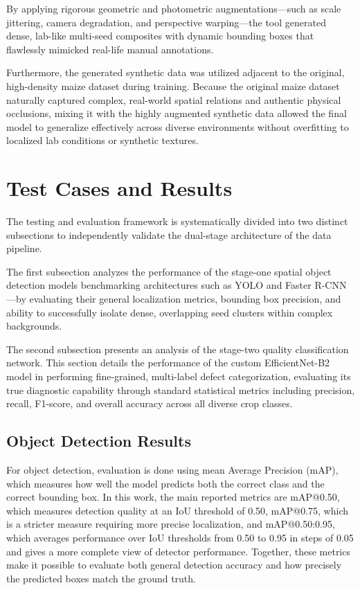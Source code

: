 By applying rigorous geometric and photometric augmentations—such as scale jittering, camera degradation, and perspective warping—the tool generated dense, lab-like multi-seed composites with dynamic bounding boxes that flawlessly mimicked real-life manual annotations. 

Furthermore, the generated synthetic data was utilized adjacent to the original, high-density maize dataset during training. Because the original maize dataset naturally captured complex, real-world spatial relations and authentic physical occlusions, mixing it with the highly augmented synthetic data allowed the final model to generalize effectively across diverse environments without overfitting to localized lab conditions or synthetic textures.


\section{Test Cases and Results}
\label{sec:ch6-test-cases}

The testing and evaluation framework is systematically divided into two distinct subsections to independently validate the dual-stage architecture of the data pipeline. 

The first subsection analyzes the performance of the stage-one spatial object detection models benchmarking architectures such as YOLO and Faster R-CNN—by evaluating their general localization metrics, bounding box precision, and ability to successfully isolate dense, overlapping seed clusters within complex backgrounds.

The second subsection presents an analysis of the stage-two quality classification network. This section details the performance of the custom EfficientNet-B2 model in performing fine-grained, multi-label defect categorization, evaluating its true diagnostic capability through standard statistical metrics including precision, recall, F1-score, and overall accuracy across all diverse crop classes.

\subsection{Object Detection Results}
\label{sec:ch6-detection}

For object detection, evaluation is done using mean Average Precision (mAP), which measures how well the model predicts both the correct class and the correct bounding box. In this work, the main reported metrics are mAP@0.50, which measures detection quality at an IoU threshold of 0.50, mAP@0.75, which is a stricter measure requiring more precise localization, and mAP@0.50:0.95, which averages performance over IoU thresholds from 0.50 to 0.95 in steps of 0.05 and gives a more complete view of detector performance. Together, these metrics make it possible to evaluate both general detection accuracy and how precisely the predicted boxes match the ground truth.

